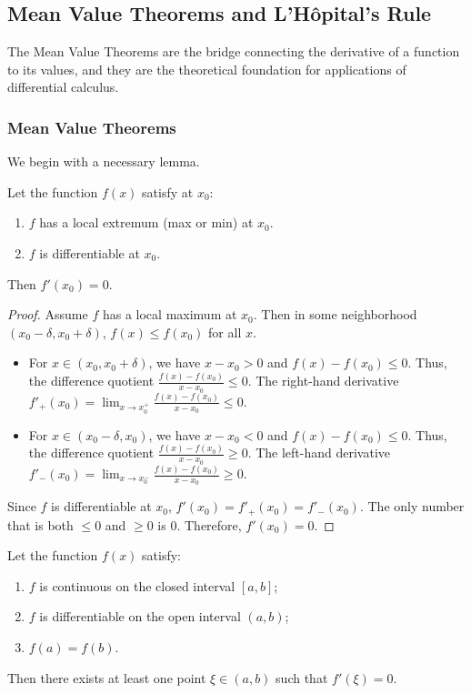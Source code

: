 \subsection{Mean Value Theorems and L'Hôpital's Rule}

The Mean Value Theorems are the bridge connecting the derivative of a function to its values, and they are the theoretical foundation for applications of differential calculus.

\subsubsection{Mean Value Theorems}

We begin with a necessary lemma.

\begin{theorem}
Let the function $f(x)$ satisfy at $x_0$:
\begin{enumerate}
    \item $f$ has a local extremum (max or min) at $x_0$.
    \item $f$ is differentiable at $x_0$.
\end{enumerate}
Then $f'(x_0) = 0$.
\end{theorem}

\begin{proof}
Assume $f$ has a local maximum at $x_0$. Then in some neighborhood $(x_0-\delta, x_0+\delta)$, $f(x) \leq f(x_0)$ for all $x$.
\begin{itemize}
    \item For $x \in (x_0, x_0+\delta)$, we have $x - x_0 > 0$ and $f(x) - f(x_0) \leq 0$.
    Thus, the difference quotient $\frac{f(x) - f(x_0)}{x - x_0} \leq 0$.
    The right-hand derivative $f'_+(x_0) = \lim_{x \to x_0^+} \frac{f(x) - f(x_0)}{x - x_0} \leq 0$.
    
    \item For $x \in (x_0-\delta, x_0)$, we have $x - x_0 < 0$ and $f(x) - f(x_0) \leq 0$.
    Thus, the difference quotient $\frac{f(x) - f(x_0)}{x - x_0} \geq 0$.
    The left-hand derivative $f'_-(x_0) = \lim_{x \to x_0^-} \frac{f(x) - f(x_0)}{x - x_0} \geq 0$.
\end{itemize}
Since $f$ is differentiable at $x_0$, $f'(x_0) = f'_+(x_0) = f'_-(x_0)$.
The only number that is both $\leq 0$ and $\geq 0$ is $0$.
Therefore, $f'(x_0) = 0$.
\end{proof}

\begin{theorem}
\label{thm:rolle_en}
Let the function $f(x)$ satisfy:
\begin{enumerate}
    \item $f$ is continuous on the closed interval $[a, b]$;
    \item $f$ is differentiable on the open interval $(a, b)$;
    \item $f(a) = f(b)$.
\end{enumerate}
Then there exists at least one point $\xi \in (a, b)$ such that $f'(\xi) = 0$.
\end{theorem}




